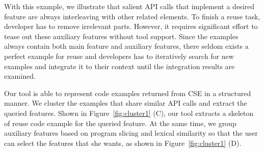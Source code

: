 With this example, we illustrate that salient API calls that implement a desired feature are always interleaving with other related elements. To finish a reuse task, developer has to remove irrelevant parts.  However, it  requires significant effort to tease out these auxiliary features without tool support. Since the examples always contain both main feature and auxiliary features,  there seldom exists a perfect example for reuse and developers has to iteratively search for new examples and integrate it to their context until the integration results are examined.     

 Our tool is able to represent code examples returned from CSE in a structured manner. We cluster the examples that share similar API calls and extract the queried features. Shown in Figure~\ref{fig:cluster1} (C), our tool extracts a skeleton of reuse code example for the queried feature. At the same time, we group auxiliary features based on program slicing and lexical similarity so that the user can select the features that she wants, as shown in Figure~\ref{fig:cluster1} (D). 














